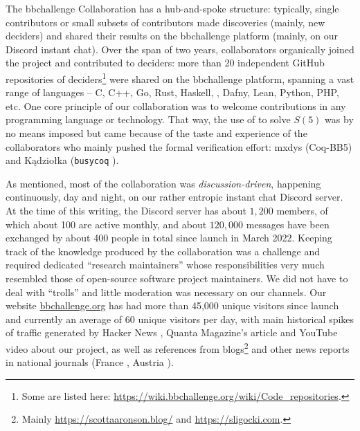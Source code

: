 \documentclass[a4paper,british]{article}
\theoremstyle{definition} %
\numberwithin{equation}{section}
\theoremstyle{definition} %
\newcommand{\CoqBB}{Coq-BB5\xspace}
\begin{document}
The bbchallenge Collaboration has a hub-and-spoke structure: typically, single contributors or small subsets of contributors made discoveries (mainly, new deciders) and shared their results on the bbchallenge platform (mainly, on our Discord instant chat). Over the span of two years, collaborators organically joined the project and contributed to deciders: more than 20 independent GitHub repositories of deciders\footnote{Some are listed here: \url{https://wiki.bbchallenge.org/wiki/Code_repositories}.} were shared on the bbchallenge platform, spanning a vast range of languages -- C, C++, Go, Rust, Haskell, \Coq, Dafny, Lean, Python, PHP, etc. One core principle of our collaboration was to welcome contributions in any programming language or technology. That way, the use of \Coq to solve $S(5)$ was by no means imposed but came because of the taste and experience of the collaborators who mainly pushed the formal verification effort: mxdys (\CoqBB) and Kądziołka (\texttt{busycoq} \cite{busycoq}).


As mentioned, most of the collaboration was \textit{discussion-driven}, happening continuously, day and night, on our rather entropic instant chat Discord server. At the time of this writing, the Discord server has about $1{,}200$ members, of which about 100 are active monthly, and about $120{,}000$ messages have been exchanged by about 400 people in total since launch in March 2022. Keeping track of the knowledge produced by the collaboration was a challenge and required dedicated ``research maintainers'' whose responsibilities very much resembled those of open-source software project maintainers. We did not have to deal with ``trolls'' and little moderation was necessary on our channels. Our website \href{https://bbchallenge.or}{bbchallenge.org} has had more than 45,000 unique visitors since launch and currently an average of 60 unique visitors per day, with main historical spikes of traffic generated by Hacker News \cite{bmc7505_2023_busybeaver}, Quanta Magazine's article \cite{brubaker2024_bb5_quanta} and YouTube video \cite{quanta2025_busybeaver_video} about our project, as well as references from blogs\footnote{Mainly \url{https://scottaaronson.blog/} and \url{https://sligocki.com}.} and other news reports in national journals (France \cite{larousserie2024_castor}, Austria \cite{derstandard2025_fleissiger_biber}).
\end{document}
